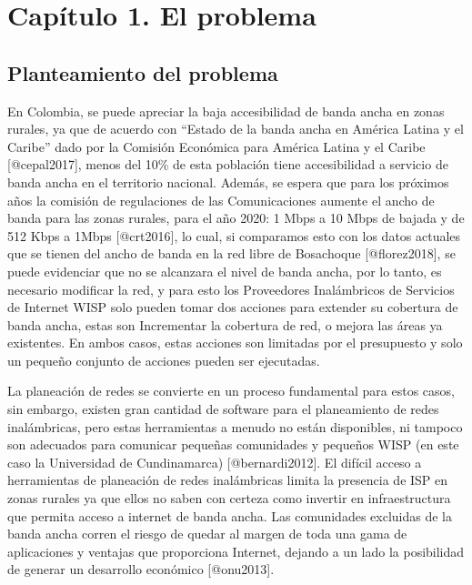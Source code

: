 \documentclass[]{article}
\date{}
\begin{document}
\section{Capítulo 1. El problema}\label{capuxedtulo-1.-el-problema}

\subsection{Planteamiento del
problema}\label{planteamiento-del-problema}

En Colombia, se puede apreciar la baja accesibilidad de banda ancha en
zonas rurales, ya que de acuerdo con ``Estado de la banda ancha en
América Latina y el Caribe'' dado por la Comisión Económica para América
Latina y el Caribe {[}@cepal2017{]}, menos del 10\% de esta población
tiene accesibilidad a servicio de banda ancha en el territorio nacional.
Además, se espera que para los próximos años la comisión de regulaciones
de las Comunicaciones aumente el ancho de banda para las zonas rurales,
para el año 2020: 1 Mbps a 10 Mbps de bajada y de 512 Kbps a 1Mbps
{[}@crt2016{]}, lo cual, si comparamos esto con los datos actuales que
se tienen del ancho de banda en la red libre de Bosachoque
{[}@florez2018{]}, se puede evidenciar que no se alcanzara el nivel de
banda ancha, por lo tanto, es necesario modificar la red, y para esto
los Proveedores Inalámbricos de Servicios de Internet WISP solo pueden
tomar dos acciones para extender su cobertura de banda ancha, estas son
Incrementar la cobertura de red, o mejora las áreas ya existentes. En
ambos casos, estas acciones son limitadas por el presupuesto y solo un
pequeño conjunto de acciones pueden ser ejecutadas.

La planeación de redes se convierte en un proceso fundamental para estos
casos, sin embargo, existen gran cantidad de software para el
planeamiento de redes inalámbricas, pero estas herramientas a menudo no
están disponibles, ni tampoco son adecuados para comunicar pequeñas
comunidades y pequeños WISP (en este caso la Universidad de
Cundinamarca) {[}@bernardi2012{]}. El difícil acceso a herramientas de
planeación de redes inalámbricas limita la presencia de ISP en zonas
rurales ya que ellos no saben con certeza como invertir en
infraestructura que permita acceso a internet de banda ancha. Las
comunidades excluidas de la banda ancha corren el riesgo de quedar al
margen de toda una gama de aplicaciones y ventajas que proporciona
Internet, dejando a un lado la posibilidad de generar un desarrollo
económico {[}@onu2013{]}.
\end{document}
